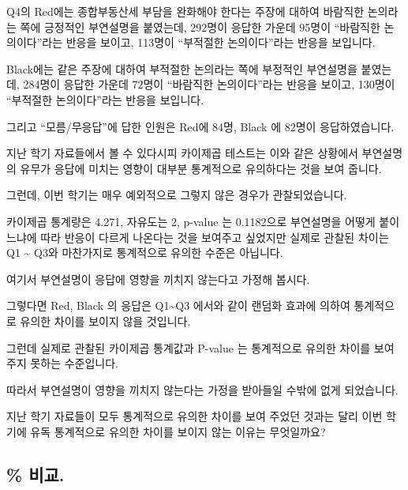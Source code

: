 \documentclass[
]{book}
\begin{document}
Q4의 Red에는 종합부동산세 부담을 완화해야 한다는 주장에 대하여 바람직한 논의라는 쪽에 긍정적인 부연설명을 붙였는데, 292명이 응답한 가운데 95명이 ``바람직한 논의이다''라는 반응을 보이고, 113명이 ``부적절한 논의이다''라는 반응을 보입니다.

Black에는 같은 주장에 대하여 부적절한 논의라는 쪽에 부정적인 부연설명을 붙였는데, 284명이 응답한 가운데 72명이 ``바람직한 논의이다''라는 반응을 보이고, 130명이 ``부적절한 논의이다''라는 반응을 보입니다.

그리고 ``모름/무응답''에 답한 인원은 Red에 84명, Black 에 82명이 응답하였습니다.

지난 학기 자료들에서 볼 수 있다시피 카이제곱 테스트는 이와 같은 상황에서 부연설명의 유무가 응답에 미치는 영향이 대부분 통계적으로 유의하다는 것을 보여 줍니다.

그런데, 이번 학기는 매우 예외적으로 그렇지 않은 경우가 관찰되었습니다.

카이제곱 통계량은 4.271, 자유도는 2, p-value 는 0.1182으로 부연설명을 어떻게 붙이느냐에 따라 반응이 다르게 나온다는 것을 보여주고 싶었지만 실제로 관찰된 차이는 Q1 \textasciitilde{} Q3와 마찬가지로 통계적으로 유의한 수준은 아닙니다.

여기서 부연설명이 응답에 영향을 끼치지 않는다고 가정해 봅시다.

그렇다면 Red, Black 의 응답은 Q1\textasciitilde Q3 에서와 같이 랜덤화 효과에 의하여 통계적으로 유의한 차이를 보이지 않을 것입니다.

그런데 실제로 관찰된 카이제곱 통계값과 P-value 는 통계적으로 유의한 차이를 보여 주지 못하는 수준입니다.

따라서 부연설명이 영향을 끼치지 않는다는 가정을 받아들일 수밖에 없게 되었습니다.

지난 학기 자료들이 모두 통계적으로 유의한 차이를 보여 주었던 것과는 달리 이번 학기에 유독 통계적으로 유의한 차이를 보이지 않는 이유는 무엇일까요?

\subsection{\% 비교.}\label{uxbe44uxad50.}
\end{document}
